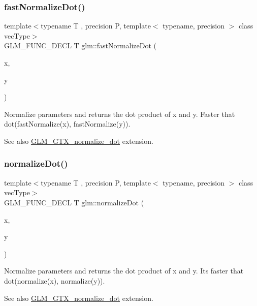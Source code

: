 \subsubsection{\texorpdfstring{fast\+Normalize\+Dot()}{fastNormalizeDot()}}
{\footnotesize\ttfamily template$<$typename T , precision P, template$<$ typename, precision $>$ class vec\+Type$>$ \\
G\+L\+M\+\_\+\+F\+U\+N\+C\+\_\+\+D\+E\+CL T glm\+::fast\+Normalize\+Dot (\begin{DoxyParamCaption}\item[{vec\+Type$<$ T, P $>$ const \&}]{x,  }\item[{vec\+Type$<$ T, P $>$ const \&}]{y }\end{DoxyParamCaption})}

Normalize parameters and returns the dot product of x and y. Faster that dot(fast\+Normalize(x), fast\+Normalize(y)).

\begin{DoxySeeAlso}{See also}
\hyperlink{group__gtx__normalize__dot}{G\+L\+M\+\_\+\+G\+T\+X\+\_\+normalize\+\_\+dot} extension. 
\end{DoxySeeAlso}
\mbox{\label{group__gtx__normalize__dot_gaffbc2f2cb15838de8886a68048f9004d}} 
\subsubsection{\texorpdfstring{normalize\+Dot()}{normalizeDot()}}
{\footnotesize\ttfamily template$<$typename T , precision P, template$<$ typename, precision $>$ class vec\+Type$>$ \\
G\+L\+M\+\_\+\+F\+U\+N\+C\+\_\+\+D\+E\+CL T glm\+::normalize\+Dot (\begin{DoxyParamCaption}\item[{vec\+Type$<$ T, P $>$ const \&}]{x,  }\item[{vec\+Type$<$ T, P $>$ const \&}]{y }\end{DoxyParamCaption})}

Normalize parameters and returns the dot product of x and y. It\textquotesingle{}s faster that dot(normalize(x), normalize(y)).

\begin{DoxySeeAlso}{See also}
\hyperlink{group__gtx__normalize__dot}{G\+L\+M\+\_\+\+G\+T\+X\+\_\+normalize\+\_\+dot} extension. 
\end{DoxySeeAlso}
